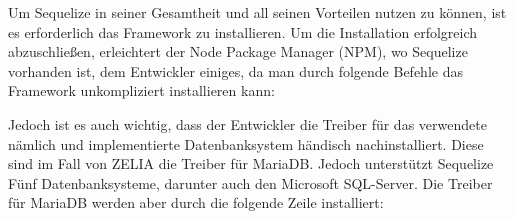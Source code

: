 
Um Sequelize in seiner Gesamtheit und all seinen Vorteilen nutzen zu können, ist es erforderlich das Framework zu installieren. Um die Installation erfolgreich abzuschließen, erleichtert der Node Package Manager (NPM), wo Sequelize vorhanden ist, dem Entwickler einiges, da man durch folgende Befehle das Framework unkompliziert installieren kann:


Jedoch ist es auch wichtig, dass der Entwickler die Treiber für das verwendete nämlich und implementierte Datenbanksystem händisch nachinstalliert. Diese sind im Fall von ZELIA die Treiber für MariaDB. Jedoch unterstützt Sequelize Fünf Datenbanksysteme, darunter auch den Microsoft SQL-Server. Die Treiber für MariaDB werden aber durch die folgende Zeile installiert:

